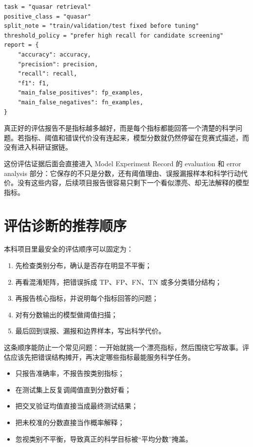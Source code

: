\begin{examplebox}[评估报告的最小骨架]
\begin{lstlisting}[style=pythonstyle]
task = "quasar retrieval"
positive_class = "quasar"
split_note = "train/validation/test fixed before tuning"
threshold_policy = "prefer high recall for candidate screening"
report = {
    "accuracy": accuracy,
    "precision": precision,
    "recall": recall,
    "f1": f1,
    "main_false_positives": fp_examples,
    "main_false_negatives": fn_examples,
}
\end{lstlisting}
\end{examplebox}

真正好的评估报告不是指标越多越好，而是每个指标都能回答一个清楚的科学问题。若指标、阈值和错误代价没有连起来，模型分数就仍然停留在竞赛式描述，而没有进入科研证据链。

这份评估证据后面会直接进入 Model Experiment Record 的 evaluation 和 error analysis 部分：它保存的不只是分数，还有阈值理由、误报漏报样本和科学行动代价。没有这些内容，后续项目报告很容易只剩下一个看似漂亮、却无法解释的模型指标。

\section{评估诊断的推荐顺序}

本科项目里最安全的评估顺序可以固定为：

\begin{enumerate}
    \item 先检查类别分布，确认是否存在明显不平衡；
    \item 再看混淆矩阵，把错误拆成 TP、FP、FN、TN 或多分类错分结构；
    \item 再报告核心指标，并说明每个指标回答的问题；
    \item 对有分数输出的模型做阈值扫描；
    \item 最后回到误报、漏报和边界样本，写出科学代价。
\end{enumerate}

这条顺序能防止一个常见问题：一开始就挑一个漂亮指标，然后围绕它写故事。评估应该先把错误结构摊开，再决定哪些指标最能服务科学任务。

\begin{warnbox}[评估中的典型误区]
\begin{itemize}
    \item 只报告准确率，不报告按类别指标；
    \item 在测试集上反复调阈值直到分数好看；
    \item 把交叉验证均值直接当成最终测试结果；
    \item 把未校准的分数直接当作概率解释；
    \item 忽视类别不平衡，导致真正的科学目标被“平均分数”掩盖。
\end{itemize}
\end{warnbox}

